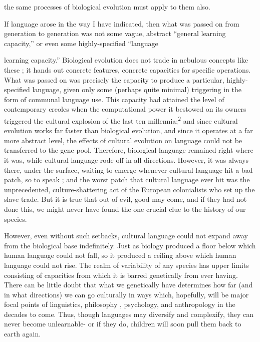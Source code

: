 the same processes of biological evolution must apply to them also.

If language arose in the way I have indicated, then what was passed on from generation to generation was not some vague, abstract ``general learning capacity,'' or even some highly-specified ``language


learning capacity.'' Biological evolution does not trade in nebulous concepts like these ; it hands out concrete features, concrete capacities for specific operations. What was passed on was precisely the capacity to produce a particular, highly-specified language, given only some (perhaps quite minimal) triggering in the form of communal language use. This capacity had attained the level of contemporary creoles when the computational power it bestowed on its owners triggered the cultural explosion of the last ten millennia;\textsuperscript{2} and since cultural evolu\-tion works far faster than biological evolution, and since it operates at a far more abstract level, the effects of cultural evolution on language could not be transferred to the gene pool. Therefore, biological lan\-guage remained right where it was, while cultural language rode off in all directions. However, it was always there, under the surface, waiting to emerge whenever cultural language hit a bad patch, so to speak ; and the worst patch that cultural language ever hit was the unprece\-dented, culture-shattering act of the European colonialists who set up the slave trade. But it is true that out of evil, good may come, and if they had not done this, we might never have found the one crucial clue to the history of our species.

However, even without such setbacks, cultural language could not expand away from the biological base indefinitely. Just as biology produced a floor below which human language could not fall, so it produced a ceiling above which human language could not rise. The realm of variability of any species has upper limits consisting of capa\-cities from which it is barred genetically from ever having. There can be little doubt that what we genetically have determines how far (and in what directions) we can go culturally in ways which, hopefully, will be major focal points of linguistics, philosophy , psychology, and anthropology in the decades to come. Thus, though languages may diversify and complexify, they can never become unlearnable- or if they do, children will soon pull them back to earth again.

